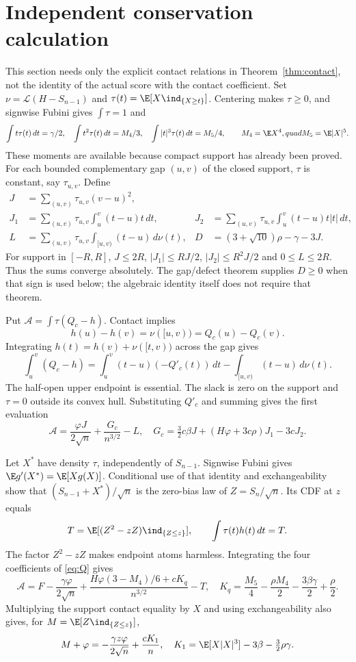 \section{Independent conservation calculation}
This section needs only the explicit contact relations in
Theorem~\ref{thm:contact}, not the identity of the actual score with the
contact coefficient. Set $\nu=\mathcal L(H-S_{n-1})$ and
$\tau(t)=\E[X\ind_{\{X\ge t\}}]$. Centering makes $\tau\ge0$, and
signwise Fubini gives $\int\tau=1$ and
\[
 \int t\tau(t)\,dt=\gamma/2,\quad
 \int t^2\tau(t)\,dt=M_4/3,\quad
 \int |t|^3\tau(t)\,dt=M_5/4,
 \qquad M_4=\E X^4,quad M_5=\E|X|^5.
\]
These moments are available because compact support has already been
proved. For each bounded complementary gap $(u,v)$ of the closed support,
$\tau$ is constant, say $\tau_{u,v}$. Define
\begin{align*}
 J&=\sum_{(u,v)}\tau_{u,v}(v-u)^2,\\
 J_1&=\sum_{(u,v)}\tau_{u,v}\int_u^v(t-u)t\,dt,
 &J_2&=\sum_{(u,v)}\tau_{u,v}\int_u^v(t-u)t|t|\,dt,\\
 L&=\sum_{(u,v)}\tau_{u,v}\int_{[u,v)}(t-u)\,d\nu(t),
 &D&=(3+\sqrt{10})\rho-\gamma-3J.
\end{align*}
For support in $[-R,R]$, $J\le2R$, $|J_1|\le RJ/2$,
$|J_2|\le R^2J/2$ and $0\le L\le2R$. Thus the sums converge absolutely.
The gap/defect theorem supplies $D\ge0$ when that sign is used below;
the algebraic identity itself does not require that theorem.

Put $\mathcal A=\int\tau(Q_c-h)$. Contact implies
\[
 h(u)-h(v)=\nu([u,v))=Q_c(u)-Q_c(v).
\]
Integrating $h(t)=h(v)+\nu([t,v))$ across the gap gives
\[
 \int_u^v(Q_c-h)
 =\int_u^v(t-u)(-Q'_c(t))\,dt-\int_{[u,v)}(t-u)\,d\nu(t).
\]
The half-open upper endpoint is essential. The slack is zero on the
support and $\tau=0$ outside its convex hull. Substituting $Q'_c$ and
summing gives the first evaluation
\begin{equation}\label{eq:first}
 \mathcal A=\frac{\varphi J}{2\sqrt n}+\frac{G_c}{n^{3/2}}-L,
 \quad G_c=\tfrac32c\beta J+(H\varphi+3c\rho)J_1-3cJ_2.
\end{equation}

Let $X^*$ have density $\tau$, independently of $S_{n-1}$. Signwise
Fubini gives $\E g'(X^*)=\E[Xg(X)]$. Conditional use of that identity
and exchangeability show that $(S_{n-1}+X^*)/\sqrt n$ is the zero-bias
law of $Z=S_n/\sqrt n$. Its CDF at $z$ equals
\[
 T=\E[(Z^2-zZ)\ind_{\{Z\le z\}}],
 \qquad\int\tau(t)h(t)\,dt=T.
\]
The factor $Z^2-zZ$ makes endpoint atoms harmless. Integrating the four
coefficients of \eqref{eq:Q} gives
\begin{equation}\label{eq:second}
 \mathcal A=F-\frac{\gamma\varphi}{2\sqrt n}
 +\frac{H\varphi(3-M_4)/6+cK_q}{n^{3/2}}-T,
 \quad K_q=\frac{M_5}4-\frac{\rho M_4}2-\frac{3\beta\gamma}2+\frac\rho2.
\end{equation}
Multiplying the support contact equality by $X$ and using exchangeability
also gives, for $M=\E[Z\ind_{\{Z\le z\}}]$,
\begin{equation}\label{eq:firstmoment}
 M+\varphi=-\frac{\gamma z\varphi}{2\sqrt n}+\frac{cK_1}{n},
 \quad K_1=\E[X|X|^3]-3\beta-\tfrac32\rho\gamma.
\end{equation}

